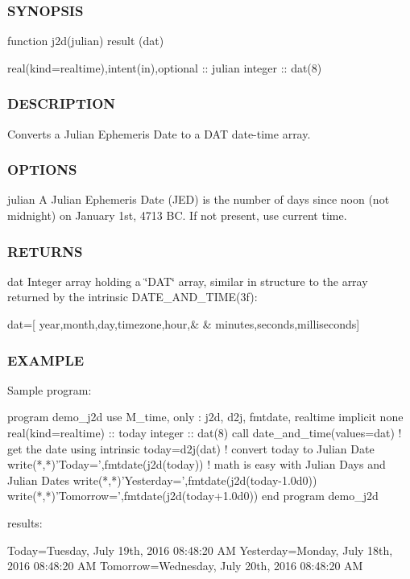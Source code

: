 \subsubsection*{S\+Y\+N\+O\+P\+S\+IS}

\begin{DoxyVerb}function j2d(julian) result (dat)

 real(kind=realtime),intent(in),optional :: julian
 integer                                 :: dat(8)
\end{DoxyVerb}


\subsubsection*{D\+E\+S\+C\+R\+I\+P\+T\+I\+ON}

Converts a Julian Ephemeris Date to a D\+AT date-\/time array.

\subsubsection*{O\+P\+T\+I\+O\+NS}

julian A Julian Ephemeris Date (J\+ED) is the number of days since noon (not midnight) on January 1st, 4713 BC. If not present, use current time.

\subsubsection*{R\+E\+T\+U\+R\+NS}

dat Integer array holding a \char`\"{}\+D\+A\+T\char`\"{} array, similar in structure to the array returned by the intrinsic D\+A\+T\+E\+\_\+\+A\+N\+D\+\_\+\+T\+I\+M\+E(3f)\+: \begin{DoxyVerb}   dat=[ year,month,day,timezone,hour,&
    & minutes,seconds,milliseconds]
\end{DoxyVerb}


\subsubsection*{E\+X\+A\+M\+P\+LE}

\begin{DoxyVerb}Sample program:

 program demo_j2d
 use M_time, only : j2d, d2j, fmtdate, realtime
 implicit none
 real(kind=realtime) :: today
 integer :: dat(8)
    call date_and_time(values=dat) ! get the date using intrinsic
    today=d2j(dat)                  ! convert today to Julian Date
    write(*,*)'Today=',fmtdate(j2d(today))
    ! math is easy with Julian Days and Julian Dates
    write(*,*)'Yesterday=',fmtdate(j2d(today-1.0d0))
    write(*,*)'Tomorrow=',fmtdate(j2d(today+1.0d0))
 end program demo_j2d

results:

 Today=Tuesday, July 19th, 2016 08:48:20 AM
 Yesterday=Monday, July 18th, 2016 08:48:20 AM
 Tomorrow=Wednesday, July 20th, 2016 08:48:20 AM
\end{DoxyVerb}

